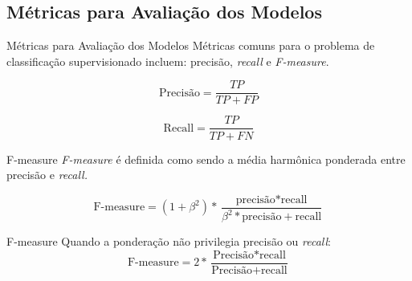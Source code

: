 \subsection{Métricas para Avaliação dos Modelos}
\begin{frame}{Métricas para Avaliação dos Modelos}
    Métricas comuns para o problema de classificação supervisionado incluem:
    precisão, \textit{recall} e \textit{F-measure}.

    \begin{equation}
        \text{Precisão} = \frac{TP}{TP + FP} 
    \end{equation}

    \vspace{0.2cm}

    \begin{equation}
        \text{Recall} = \frac{TP}{TP + FN}
    \end{equation}

    \vspace{0.2cm}
\end{frame}

\begin{frame}{F-measure}
    \textit{F-measure} é definida como sendo a média harmônica ponderada entre
    precisão e \textit{recall.} 

    \vspace{0.2cm}

    \begin{equation}
        \text{F-measure} = (1 + \beta^2 ) * \frac{\text{precisão} * \text{recall}}
                                             {\beta^2 * \text{precisão} + \text{recall}}
    \end{equation}
\end{frame}

\begin{frame}{F-measure}
    Quando a ponderação não privilegia precisão ou \textit{recall}: 
    \begin{equation}
        \text{F-measure} = 2 * \frac{\text{Precisão} * \text{recall}}
                                    {\text{Precisão} + \text{recall}}
    \end{equation}
\end{frame}

